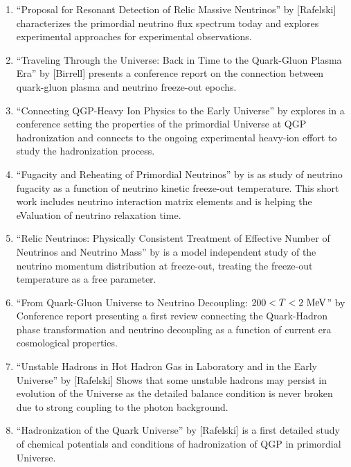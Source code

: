 \begin{enumerate}
%
\item ``Proposal for Resonant Detection of Relic Massive Neutrinos'' by [Rafelski] characterizes the primordial neutrino flux spectrum today and explores experimental approaches for experimental observations.
%
\item ``Traveling Through the Universe: Back in Time to the Quark-Gluon Plasma Era'' by [Birrell] presents a conference report on the connection between quark-gluon plasma and neutrino freeze-out epochs.
%
\item ``Connecting QGP-Heavy Ion Physics to the Early Universe'' by  explores in a conference setting the properties of the primordial Universe at QGP hadronization and connects to the ongoing experimental heavy-ion effort to study the hadronization process.
%
\item ``Fugacity and Reheating of Primordial Neutrinos'' by  is as study of neutrino fugacity as a function of neutrino kinetic freeze-out temperature. This short work includes neutrino interaction matrix elements and is helping the\,eValuation of neutrino relaxation time. 
%
\item ``Relic Neutrinos: Physically Consistent Treatment of Effective Number of Neutrinos and Neutrino Mass'' by  is a model independent study of the neutrino momentum distribution at freeze-out, treating the freeze-out temperature as a free parameter.
%
\item ``From Quark-Gluon Universe to Neutrino Decoupling: $200 < T < 2\text{ MeV}$'' by  Conference report presenting a first review connecting the Quark-Hadron phase transformation and neutrino decoupling as a function of current era cosmological properties.
%
\item ``Unstable Hadrons in Hot Hadron Gas in Laboratory and in the Early Universe'' by [Rafelski] Shows that some unstable hadrons may persist in evolution of the Universe as the detailed balance condition is never broken due to strong coupling to the photon background.
%
\item ``Hadronization of the Quark Universe'' by [Rafelski] is a first detailed study of chemical potentials and conditions of hadronization of QGP in primordial Universe.
%
\end{enumerate}
